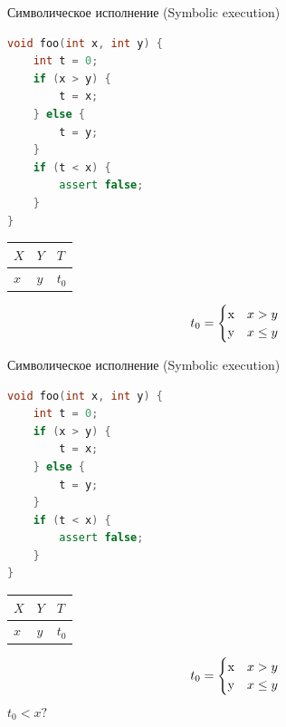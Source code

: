 \documentclass{beamer}
\begin{document}
\begin{frame}[fragile]{Символическое исполнение (Symbolic execution)}
\begin{minipage}{0.49\textwidth}
\begin{lstlisting}[language=C++]
void foo(int x, int y) {
    int t = 0;
    if (x > y) {
        t = x;
    } else {
        t = y;
    }
    if (t < x) {
        assert false;
    }
}
\end{lstlisting}
\end{minipage}
\hfill
\begin{minipage}{0.49\textwidth}
\begin{center}
\begin{tabular}{ | l | l | l | }
\hline
$X$ & $Y$ & $T$ \\
\hline
$x$ & $y$ & $t_0$ \\
\hline
\end{tabular}
\begin{equation*}
t_0 =
    \begin{cases}
    $x$ &\text{$x > y$}\\
    $y$ &\text{$x \le y$}
    \end{cases}
\end{equation*}
\end{center}
\end{minipage}
\end{frame}

\begin{frame}[fragile]{Символическое исполнение (Symbolic execution)}
\begin{minipage}{0.49\textwidth}
\begin{lstlisting}[language=C++]
void foo(int x, int y) {
    int t = 0;
    if (x > y) {
        t = x;
    } else {
        t = y;
    }
    if (t < x) {
        assert false;
    }
}
\end{lstlisting}
\end{minipage}
\hfill
\begin{minipage}{0.49\textwidth}
\begin{center}
\begin{tabular}{ | l | l | l | }
\hline
$X$ & $Y$ & $T$ \\
\hline
$x$ & $y$ & $t_0$ \\
\hline
\end{tabular}
\begin{equation*}
t_0 =
    \begin{cases}
    $x$ &\text{$x > y$}\\
    $y$ &\text{$x \le y$}
    \end{cases}
\end{equation*}
$t_0 < x?$
\end{center}
\end{minipage}
\end{frame}
\end{document}
